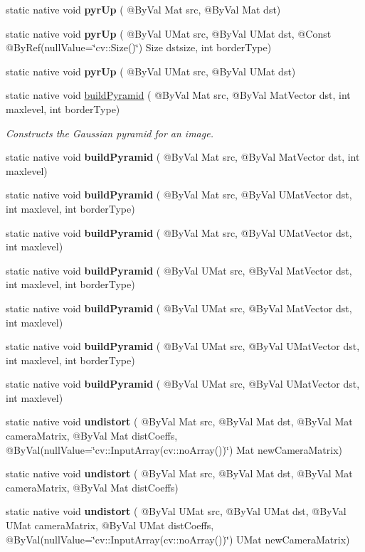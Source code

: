 \begin{DoxyCompactItemize}
static native void {\bfseries pyr\+Up} ( @By\+Val Mat src, @By\+Val Mat dst)
\item 
static native void {\bfseries pyr\+Up} ( @By\+Val U\+Mat src, @By\+Val U\+Mat dst, @Const @By\+Ref(null\+Value=\char`\"{}cv\+::\+Size()\char`\"{}) Size dstsize, int border\+Type)
\item 
static native void {\bfseries pyr\+Up} ( @By\+Val U\+Mat src, @By\+Val U\+Mat dst)
\item 
static native void \hyperlink{group__imgproc__filter_ga418b215211fecb0c256c9db02d80dd0e}{build\+Pyramid} ( @By\+Val Mat src, @By\+Val Mat\+Vector dst, int maxlevel, int border\+Type)
\begin{DoxyCompactList}\small\item\em Constructs the Gaussian pyramid for an image. \end{DoxyCompactList}\item 
static native void {\bfseries build\+Pyramid} ( @By\+Val Mat src, @By\+Val Mat\+Vector dst, int maxlevel)
\item 
static native void {\bfseries build\+Pyramid} ( @By\+Val Mat src, @By\+Val U\+Mat\+Vector dst, int maxlevel, int border\+Type)
\item 
static native void {\bfseries build\+Pyramid} ( @By\+Val Mat src, @By\+Val U\+Mat\+Vector dst, int maxlevel)
\item 
static native void {\bfseries build\+Pyramid} ( @By\+Val U\+Mat src, @By\+Val Mat\+Vector dst, int maxlevel, int border\+Type)
\item 
static native void {\bfseries build\+Pyramid} ( @By\+Val U\+Mat src, @By\+Val Mat\+Vector dst, int maxlevel)
\item 
static native void {\bfseries build\+Pyramid} ( @By\+Val U\+Mat src, @By\+Val U\+Mat\+Vector dst, int maxlevel, int border\+Type)
\item 
static native void {\bfseries build\+Pyramid} ( @By\+Val U\+Mat src, @By\+Val U\+Mat\+Vector dst, int maxlevel)
\item 
static native void {\bfseries undistort} ( @By\+Val Mat src, @By\+Val Mat dst, @By\+Val Mat camera\+Matrix, @By\+Val Mat dist\+Coeffs, @By\+Val(null\+Value=\char`\"{}cv\+::\+Input\+Array(cv\+::no\+Array())\char`\"{}) Mat new\+Camera\+Matrix)
\item 
static native void {\bfseries undistort} ( @By\+Val Mat src, @By\+Val Mat dst, @By\+Val Mat camera\+Matrix, @By\+Val Mat dist\+Coeffs)
\item 
static native void {\bfseries undistort} ( @By\+Val U\+Mat src, @By\+Val U\+Mat dst, @By\+Val U\+Mat camera\+Matrix, @By\+Val U\+Mat dist\+Coeffs, @By\+Val(null\+Value=\char`\"{}cv\+::\+Input\+Array(cv\+::no\+Array())\char`\"{}) U\+Mat new\+Camera\+Matrix)

\end{DoxyCompactItemize}
